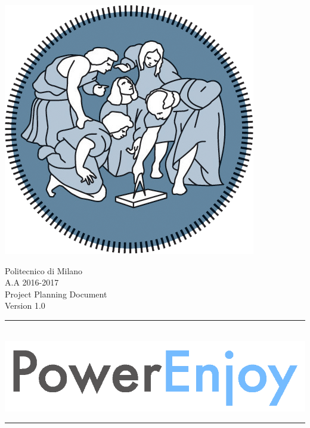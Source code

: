 \documentclass[12pt]{article}
\begin{document}
   
	\begin{center}
 	 	\includegraphics[scale=1.5]{Images/PolimiLogo.png}
	\end{center}

	\begin{center}
	 	{\Huge Politecnico di Milano}\\
	 	\vspace{5mm}
		{\Large A.A 2016-2017} 
		\vspace{5mm}\\
		{\huge Project Planning Document}   
		\vspace{5mm}\\
		{\large Version 1.0}  
    \end{center}
     
    \begin{center}
		\noindent\rule{8cm}{0.8pt}
		 \vspace{5mm}\\
 	 	 \includegraphics[scale=1]{Images/logoPowerEnjoy2.png}\\
		\noindent\rule{8cm}{0.8pt}
	\end{center}
	 	\vspace{5mm}
	 		
\end{document}
